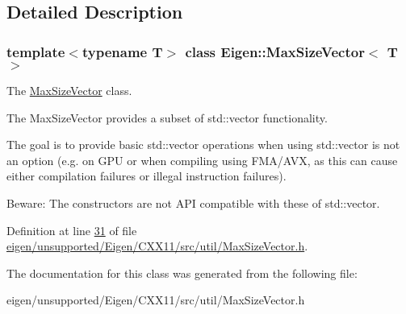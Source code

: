 \subsection{Detailed Description}
\subsubsection*{template$<$typename T$>$\newline
class Eigen\+::\+Max\+Size\+Vector$<$ T $>$}

The \hyperlink{class_eigen_1_1_max_size_vector}{Max\+Size\+Vector} class. 

The Max\+Size\+Vector provides a subset of std\+::vector functionality.

The goal is to provide basic std\+::vector operations when using std\+::vector is not an option (e.\+g. on G\+PU or when compiling using F\+M\+A/\+A\+VX, as this can cause either compilation failures or illegal instruction failures).

Beware\+: The constructors are not A\+PI compatible with these of std\+::vector. 

Definition at line \hyperlink{eigen_2unsupported_2_eigen_2_c_x_x11_2src_2util_2_max_size_vector_8h_source_l00031}{31} of file \hyperlink{eigen_2unsupported_2_eigen_2_c_x_x11_2src_2util_2_max_size_vector_8h_source}{eigen/unsupported/\+Eigen/\+C\+X\+X11/src/util/\+Max\+Size\+Vector.\+h}.



The documentation for this class was generated from the following file\+:\begin{DoxyCompactItemize}
\item 
eigen/unsupported/\+Eigen/\+C\+X\+X11/src/util/\+Max\+Size\+Vector.\+h\end{DoxyCompactItemize}
